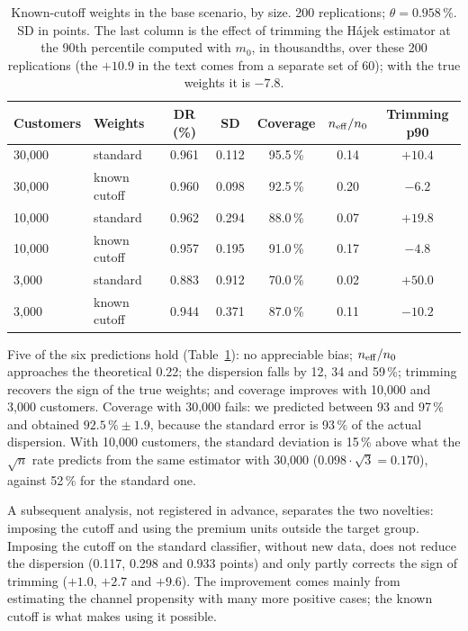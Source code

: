 \begin{table}[ht]
\centering\small
\caption{Known-cutoff weights in the base scenario, by size. 200 replications; $\theta=0.958\,\%$. SD in points. The last column is the effect of trimming the Hájek estimator at the 90th percentile computed with $m_0$, in thousandths, over these 200 replications (the $+10.9$ in the text comes from a separate set of 60); with the true weights it is $-7.8$.}\label{tab:cutoff}
\begin{tabular}{@{}llccccc@{}}
\toprule
Customers & Weights & DR (\%) & SD & Coverage & $n_{\mathrm{eff}}/n_0$ & Trimming p90 \\
\midrule
30{,}000 & standard & 0.961 & 0.112 & 95.5\,\% & 0.14 & $+10.4$ \\
30{,}000 & known cutoff & 0.960 & 0.098 & 92.5\,\% & 0.20 & $-6.2$ \\
10{,}000 & standard & 0.962 & 0.294 & 88.0\,\% & 0.07 & $+19.8$ \\
10{,}000 & known cutoff & 0.957 & 0.195 & 91.0\,\% & 0.17 & $-4.8$ \\
3{,}000 & standard & 0.883 & 0.912 & 70.0\,\% & 0.02 & $+50.0$ \\
3{,}000 & known cutoff & 0.944 & 0.371 & 87.0\,\% & 0.11 & $-10.2$ \\
\bottomrule
\end{tabular}
\end{table}

Five of the six predictions hold (Table~\ref{tab:cutoff}): no appreciable bias; $n_{\mathrm{eff}}/n_0$ approaches the theoretical 0.22; the dispersion falls by 12, 34 and 59\,\%; trimming recovers the sign of the true weights; and coverage improves with 10{,}000 and 3{,}000 customers. Coverage with 30{,}000 fails: we predicted between 93 and 97\,\% and obtained $92.5\,\%\pm1.9$, because the standard error is 93\,\% of the actual dispersion. With 10{,}000 customers, the standard deviation is 15\,\% above what the $\sqrt n$ rate predicts from the same estimator with 30{,}000 ($0.098\cdot\sqrt3=0.170$), against 52\,\% for the standard one.

A subsequent analysis, not registered in advance, separates the two novelties: imposing the cutoff and using the premium units outside the target group. Imposing the cutoff on the standard classifier, without new data, does not reduce the dispersion (0.117, 0.298 and 0.933 points) and only partly corrects the sign of trimming ($+1.0$, $+2.7$ and $+9.6$). The improvement comes mainly from estimating the channel propensity with many more positive cases; the known cutoff is what makes using it possible.

